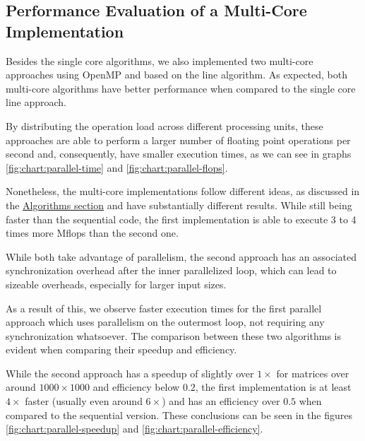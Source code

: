 
\subsection{Performance Evaluation of a Multi-Core Implementation}

Besides the single core algorithms, we also implemented two multi-core approaches using OpenMP and based on the line algorithm.
As expected, both multi-core algorithms have better performance when compared to the single core line approach. 

By distributing the operation load across different processing units, these approaches are able to perform a larger number of floating point operations per second and, consequently, have smaller execution times, as we can see in graphs \ref{fig:chart:parallel-time} and \ref{fig:chart:parallel-flops}.

Nonetheless, the multi-core implementations follow different ideas, as discussed in the \hyperref[section:algorithms]{Algorithms section} and have substantially different results. While still being faster than the sequential code, the first implementation is able to execute 3 to 4 times more Mflops than the second one.

While both take advantage of parallelism, the second approach has an associated synchronization overhead after the inner parallelized loop, which can lead to sizeable overheads, especially for larger input sizes.

As a result of this, we observe faster execution times for the first parallel approach which uses parallelism on the outermost loop, not requiring any synchronization whatsoever. The comparison between these two algorithms is evident when comparing their speedup and efficiency. 

While the second approach has a speedup of slightly over $1\times$ for matrices over around $1000 \times 1000$ and efficiency below $0.2$, the first implementation is at least $4\times$ faster (usually even around $6\times$) and has an efficiency over $0.5$ when compared to the sequential version. These conclusions can be seen in the figures \ref{fig:chart:parallel-speedup} and \ref{fig:chart:parallel-efficiency}.

